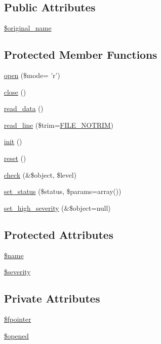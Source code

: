 \subsection*{Public Attributes}
\begin{DoxyCompactItemize}
\item 
\hyperlink{classFileHandler_a477708585850c3c8725ccf56bfe0b4a8}{\$original\_\-name}
\end{DoxyCompactItemize}
\subsection*{Protected Member Functions}
\begin{DoxyCompactItemize}
\item 
\hyperlink{classFileHandler_a2a650b033c4eb1f98ba47fb05ce7b454}{open} (\$mode= 'r')
\item 
\hyperlink{classFileHandler_aa48e7c3b67346e29b194d2f0ac5dd1f8}{close} ()
\item 
\hyperlink{classFileHandler_a1389a6ea19a22471c301d70b5ed68ed8}{read\_\-data} ()
\item 
\hyperlink{classFileHandler_a69f84a8138f717c84f560125f1f95448}{read\_\-line} (\$trim=\hyperlink{class_8filehandler_8php_a3720f2e15eb9e16e29d8ecbb96763662}{FILE\_\-NOTRIM})
\item 
\hyperlink{class__OWL_ae0ef3ded56e8a6b34b6461e5a721cd3e}{init} ()
\item 
\hyperlink{class__OWL_a2f2a042bcf31965194c03033df0edc9b}{reset} ()
\item 
\hyperlink{class__OWL_ad6f4f6946f40199dd0333cf219fa500e}{check} (\&\$object, \$level)
\item 
\hyperlink{class__OWL_aea912d0ede9b3c2a69b79072d94d4787}{set\_\-status} (\$status, \$params=array())
\item 
\hyperlink{class__OWL_a576829692a3b66e3d518853bf43abae3}{set\_\-high\_\-severity} (\&\$object=null)
\end{DoxyCompactItemize}
\subsection*{Protected Attributes}
\begin{DoxyCompactItemize}
\item 
\hyperlink{classFileHandler_a94903bd51b241928ed415ad271c38805}{\$name}
\item 
\hyperlink{class__OWL_ad26b40a9dbbacb33e299b17826f8327c}{\$severity}
\end{DoxyCompactItemize}
\subsection*{Private Attributes}
\begin{DoxyCompactItemize}
\item 
\hyperlink{classFileHandler_aa0aa66fd3ad551b3f508b901a95c0c2d}{\$fpointer}
\item 
\hyperlink{classFileHandler_a061409b2bbd2e13bc47415527c0de720}{\$opened}
\end{DoxyCompactItemize}


